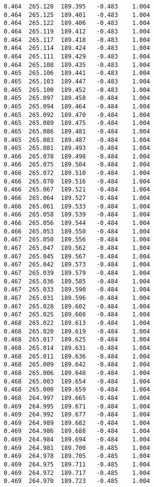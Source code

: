 \begin{verbatim}
   0.464  265.128  189.395   -0.483    1.004
   0.464  265.125  189.401   -0.483    1.004
   0.464  265.122  189.406   -0.483    1.004
   0.464  265.119  189.412   -0.483    1.004
   0.464  265.117  189.418   -0.483    1.004
   0.464  265.114  189.424   -0.483    1.004
   0.464  265.111  189.429   -0.483    1.004
   0.464  265.108  189.435   -0.483    1.004
   0.465  265.106  189.441   -0.483    1.004
   0.465  265.103  189.447   -0.483    1.004
   0.465  265.100  189.452   -0.483    1.004
   0.465  265.097  189.458   -0.484    1.004
   0.465  265.094  189.464   -0.484    1.004
   0.465  265.092  189.470   -0.484    1.004
   0.465  265.089  189.475   -0.484    1.004
   0.465  265.086  189.481   -0.484    1.004
   0.465  265.083  189.487   -0.484    1.004
   0.465  265.081  189.493   -0.484    1.004
   0.466  265.078  189.498   -0.484    1.004
   0.466  265.075  189.504   -0.484    1.004
   0.466  265.072  189.510   -0.484    1.004
   0.466  265.070  189.516   -0.484    1.004
   0.466  265.067  189.521   -0.484    1.004
   0.466  265.064  189.527   -0.484    1.004
   0.466  265.061  189.533   -0.484    1.004
   0.466  265.058  189.539   -0.484    1.004
   0.466  265.056  189.544   -0.484    1.004
   0.466  265.053  189.550   -0.484    1.004
   0.467  265.050  189.556   -0.484    1.004
   0.467  265.047  189.562   -0.484    1.004
   0.467  265.045  189.567   -0.484    1.004
   0.467  265.042  189.573   -0.484    1.004
   0.467  265.039  189.579   -0.484    1.004
   0.467  265.036  189.585   -0.484    1.004
   0.467  265.033  189.590   -0.484    1.004
   0.467  265.031  189.596   -0.484    1.004
   0.467  265.028  189.602   -0.484    1.004
   0.467  265.025  189.608   -0.484    1.004
   0.468  265.022  189.613   -0.484    1.004
   0.468  265.020  189.619   -0.484    1.004
   0.468  265.017  189.625   -0.484    1.004
   0.468  265.014  189.631   -0.484    1.004
   0.468  265.011  189.636   -0.484    1.004
   0.468  265.009  189.642   -0.484    1.004
   0.468  265.006  189.648   -0.484    1.004
   0.468  265.003  189.654   -0.484    1.004
   0.468  265.000  189.659   -0.484    1.004
   0.468  264.997  189.665   -0.484    1.004
   0.469  264.995  189.671   -0.484    1.004
   0.469  264.992  189.677   -0.484    1.004
   0.469  264.989  189.682   -0.484    1.004
   0.469  264.986  189.688   -0.484    1.004
   0.469  264.984  189.694   -0.484    1.004
   0.469  264.981  189.700   -0.485    1.004
   0.469  264.978  189.705   -0.485    1.004
   0.469  264.975  189.711   -0.485    1.004
   0.469  264.972  189.717   -0.485    1.004
   0.469  264.970  189.723   -0.485    1.004

\end{verbatim}
